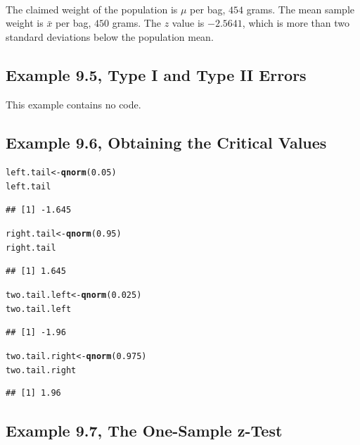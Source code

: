 \documentclass{article}\usepackage[]{graphicx}\usepackage[]{color}
\makeatletter
\newcommand{\hlnum}[1]{\textcolor[rgb]{0.686,0.059,0.569}{#1}}%
\newcommand{\hlstd}[1]{\textcolor[rgb]{0.345,0.345,0.345}{#1}}%
\newcommand{\hlkwb}[1]{\textcolor[rgb]{0.69,0.353,0.396}{#1}}%
\newcommand{\hlkwd}[1]{\textcolor[rgb]{0.737,0.353,0.396}{\textbf{#1}}}%
\newenvironment{kframe}{%
 \def\at@end@of@kframe{}%
 \ifinner\ifhmode%
  \def\at@end@of@kframe{\end{minipage}}%
  \begin{minipage}{\columnwidth}%
 \fi\fi%
 \def\FrameCommand##1{\hskip\@totalleftmargin \hskip-\fboxsep
 \colorbox{shadecolor}{##1}\hskip-\fboxsep
     \hskip-\linewidth \hskip-\@totalleftmargin \hskip\columnwidth}%
 \MakeFramed {\advance\hsize-\width
   \@totalleftmargin\z@ \linewidth\hsize
   \@setminipage}}%
 {\par\unskip\endMakeFramed%
 \at@end@of@kframe}
\newenvironment{knitrout}{}{} %
\makeatother
\begin{document}
\paragraph{}The claimed weight of the population is $\mu{}$ per bag, $454$ grams. The mean sample weight is $\bar{x}$ per bag, $450$ grams. The $z$ value is $\ensuremath{-2.5641}$, which is more than two standard deviations below the population mean. 


\subsection{Example 9.5, Type I and Type II Errors}This example contains no code.
\subsection{Example 9.6, Obtaining the Critical Values}

\begin{knitrout}
\color{fgcolor}\begin{kframe}
\begin{alltt}
\hlstd{left.tail} \hlkwb{<-} \hlkwd{qnorm}\hlstd{(}\hlnum{0.05}\hlstd{)}
\hlstd{left.tail}
\end{alltt}
\begin{verbatim}
## [1] -1.645
\end{verbatim}
\begin{alltt}
\hlstd{right.tail} \hlkwb{<-} \hlkwd{qnorm}\hlstd{(}\hlnum{0.95}\hlstd{)}
\hlstd{right.tail}
\end{alltt}
\begin{verbatim}
## [1] 1.645
\end{verbatim}
\begin{alltt}
\hlstd{two.tail.left} \hlkwb{<-} \hlkwd{qnorm}\hlstd{(}\hlnum{0.025}\hlstd{)}
\hlstd{two.tail.left}
\end{alltt}
\begin{verbatim}
## [1] -1.96
\end{verbatim}
\begin{alltt}
\hlstd{two.tail.right} \hlkwb{<-} \hlkwd{qnorm}\hlstd{(}\hlnum{0.975}\hlstd{)}
\hlstd{two.tail.right}
\end{alltt}
\begin{verbatim}
## [1] 1.96
\end{verbatim}
\end{kframe}
\end{knitrout}

\subsection{Example 9.7, The One-Sample z-Test}
\end{document}
